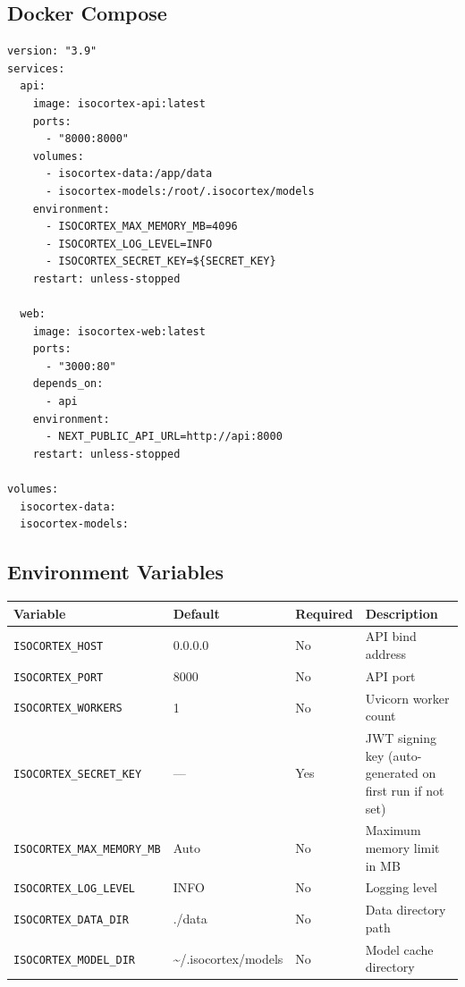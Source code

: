 \documentclass[11pt,a4paper]{article}
\newcommand{\inlinecode}[1]{\texttt{\small\colorbox{ctCodeBg}{#1}}}
\begin{document}
\subsection{Docker Compose}

\begin{lstlisting}[language={},title={docker-compose.yml}]
version: "3.9"
services:
  api:
    image: isocortex-api:latest
    ports:
      - "8000:8000"
    volumes:
      - isocortex-data:/app/data
      - isocortex-models:/root/.isocortex/models
    environment:
      - ISOCORTEX_MAX_MEMORY_MB=4096
      - ISOCORTEX_LOG_LEVEL=INFO
      - ISOCORTEX_SECRET_KEY=${SECRET_KEY}
    restart: unless-stopped

  web:
    image: isocortex-web:latest
    ports:
      - "3000:80"
    depends_on:
      - api
    environment:
      - NEXT_PUBLIC_API_URL=http://api:8000
    restart: unless-stopped

volumes:
  isocortex-data:
  isocortex-models:
\end{lstlisting}

\subsection{Environment Variables}

\begin{center}
\begin{tabular}{@{}p{4.5cm}p{2cm}p{1.5cm}p{6cm}@{}}
\toprule
\textbf{Variable} & \textbf{Default} & \textbf{Required} & \textbf{Description} \\
\midrule
\inlinecode{ISOCORTEX\_HOST} & 0.0.0.0 & No & API bind address \\
\inlinecode{ISOCORTEX\_PORT} & 8000 & No & API port \\
\inlinecode{ISOCORTEX\_WORKERS} & 1 & No & Uvicorn worker count \\
\inlinecode{ISOCORTEX\_SECRET\_KEY} & --- & Yes & JWT signing key (auto-generated on first run if not set) \\
\inlinecode{ISOCORTEX\_MAX\_MEMORY\_MB} & Auto & No & Maximum memory limit in MB \\
\inlinecode{ISOCORTEX\_LOG\_LEVEL} & INFO & No & Logging level \\
\inlinecode{ISOCORTEX\_DATA\_DIR} & ./data & No & Data directory path \\
\inlinecode{ISOCORTEX\_MODEL\_DIR} & \textasciitilde{}/.isocortex/models & No & Model cache directory \\
\bottomrule
\end{tabular}
\end{center}
\end{document}
